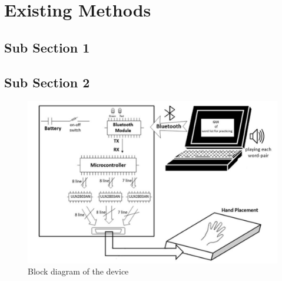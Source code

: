 \chapter{Existing Methods}
    \lipsum[2-3]

    \section{Sub Section 1}
    \lipsum[2-4]
    
    \section{Sub Section 2}
    
    
    \begin{figure}[H]
        \centering
        \includegraphics[width=400pt]{Images/device.png}
        \caption{Block diagram of the device}
    \end{figure}

    \lipsum[2]